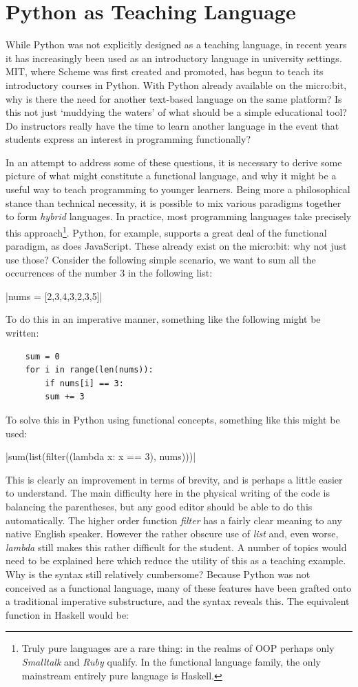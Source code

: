 \documentclass[12pt, a4paper]{report}
\begin{document}
\section{Python as Teaching Language}
While Python was not explicitly designed as a teaching language, in recent years it has increasingly
been used as an introductory language in university settings. MIT, where Scheme was first created
and promoted, has begun to teach its introductory courses in Python. With Python already available
on the micro:bit, why is there the need for another text-based language on the same platform? Is
this not just `muddying the waters' of what should be a simple educational tool? Do instructors
really have the time to learn another language in the event that students express an interest in programming
functionally?

In an attempt to address some of these questions, it is necessary to derive some picture of what might
constitute a functional language, and why it might be a useful way to teach programming to younger
learners. Being more a philosophical stance than technical necessity, it is possible to mix various
paradigms together to form \textit{hybrid} languages. In practice, most programming languages take
precisely this approach\footnote{Truly pure languages are a rare thing: in the realms of OOP perhaps
only \textit{Smalltalk} and \textit{Ruby} qualify. In the functional language family, the only
mainstream entirely pure language is Haskell.}. Python, for example, supports a great deal of the 
functional paradigm, as does JavaScript. These already exist on the micro:bit: why not just use those? 
Consider the following simple scenario, we want to sum all the occurrences of the number 3 in the
following list: 

|nums = [2,3,4,3,2,3,5]|

To do this in an imperative manner, something like the following might be written:

\begin{verbatim}
    sum = 0
    for i in range(len(nums)):
        if nums[i] == 3:
        sum += 3
\end{verbatim}

To solve this in Python using functional concepts, something like this might be used:

|sum(list(filter((lambda x: x == 3), nums)))|

This is clearly an improvement in terms of brevity, and is perhaps a little easier to understand.
The main difficulty here in the physical writing of the code is balancing the parentheses,
but any good editor should be able to do this automatically. The higher order function
\textit{filter} has a fairly clear meaning to any native English speaker. However the rather obscure
use of \textit{list} and, even worse, \textit{lambda} still makes this rather difficult for the
student. A number of topics would need to be explained here which reduce the utility
of this as a teaching example. Why is the syntax still relatively cumbersome? Because Python was
not conceived as a functional language, many of these features have been grafted onto a traditional
imperative substructure, and the syntax reveals this. The equivalent function in Haskell would be:
\end{document}
